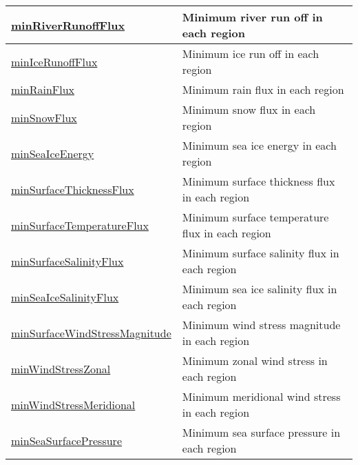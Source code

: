 {\begin{center}
\begin{longtable}{| p{2.0in} | p{4.0in} |}
    \hline
    \hyperref[subsec:var_sec_surfaceAreaWeightedAveragesAM_minRiverRunoffFlux]{minRiverRunoffFlux} & Minimum river run off in each region \\
    \hline
    \hyperref[subsec:var_sec_surfaceAreaWeightedAveragesAM_minIceRunoffFlux]{minIceRunoffFlux} & Minimum ice run off in each region \\
    \hline
    \hyperref[subsec:var_sec_surfaceAreaWeightedAveragesAM_minRainFlux]{minRainFlux} & Minimum rain flux in each region \\
    \hline
    \hyperref[subsec:var_sec_surfaceAreaWeightedAveragesAM_minSnowFlux]{minSnowFlux} & Minimum snow flux in each region \\
    \hline
    \hyperref[subsec:var_sec_surfaceAreaWeightedAveragesAM_minSeaIceEnergy]{minSeaIceEnergy} & Minimum sea ice energy in each region \\
    \hline
    \hyperref[subsec:var_sec_surfaceAreaWeightedAveragesAM_minSurfaceThicknessFlux]{minSurfaceThicknessFlux} & Minimum surface thickness flux in each region \\
    \hline
    \hyperref[subsec:var_sec_surfaceAreaWeightedAveragesAM_minSurfaceTemperatureFlux]{minSurfaceTemperatureFlux} & Minimum surface temperature flux in each region \\
    \hline
    \hyperref[subsec:var_sec_surfaceAreaWeightedAveragesAM_minSurfaceSalinityFlux]{minSurfaceSalinityFlux} & Minimum surface salinity flux in each region \\
    \hline
    \hyperref[subsec:var_sec_surfaceAreaWeightedAveragesAM_minSeaIceSalinityFlux]{minSeaIceSalinityFlux} & Minimum sea ice salinity flux in each region \\
    \hline
    \hyperref[subsec:var_sec_surfaceAreaWeightedAveragesAM_minSurfaceWindStressMagnitude]{minSurfaceWindStressMagnitude} & Minimum wind stress magnitude in each region \\
    \hline
    \hyperref[subsec:var_sec_surfaceAreaWeightedAveragesAM_minWindStressZonal]{minWindStressZonal} & Minimum zonal wind stress in each region \\
    \hline
    \hyperref[subsec:var_sec_surfaceAreaWeightedAveragesAM_minWindStressMeridional]{minWindStressMeridional} & Minimum meridional wind stress in each region \\
    \hline
    \hyperref[subsec:var_sec_surfaceAreaWeightedAveragesAM_minSeaSurfacePressure]{minSeaSurfacePressure} & Minimum sea surface pressure in each region \\
    \hline

\end{longtable}
\end{center}}
